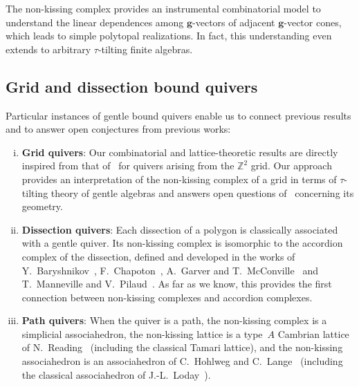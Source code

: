 \documentclass{amsart}
\theoremstyle{definition}
\newcommand{\Z}{\mathbb{Z}} %
\renewcommand{\b}[1]{\mathbf{#1}} %
\begin{document}
\noindent
The non-kissing complex provides an instrumental combinatorial model to understand the linear dependences among $\b{g}$-vectors of adjacent $\b{g}$-vector cones, which leads to simple polytopal realizations.
In fact, this understanding even extends to arbitrary $\tau$-tilting finite algebras.


\subsection*{Grid and dissection bound quivers}

\enlargethispage{.4cm}
Particular instances of gentle bound quivers enable us to connect previous results and to answer open conjectures from previous works:
\begin{enumerate}[(i)]
\item \textbf{Grid quivers}: Our combinatorial and lattice-theoretic results are directly inspired from that of~\cite{PetersenPylyavskyySpeyer, SantosStumpWelker, McConville, GarverMcConville-grid} for quivers arising from the $\Z^2$ grid. Our approach provides an interpretation of the non-kissing complex of a grid in terms of $\tau$-tilting theory of gentle algebras and answers open questions of~\cite{GarverMcConville-grid} concerning its geometry.
\item \textbf{Dissection quivers}: Each dissection of a polygon is classically associated with a gentle quiver. Its non-kissing complex is isomorphic to the accordion complex of the dissection, defined and developed in the works of Y.~Baryshnikov~\cite{Baryshnikov}, F.~Chapoton~\cite{Chapoton-quadrangulations}, A.~Garver and T.~McConville~\cite{GarverMcConville} and T.~Manneville and V.~Pilaud~\cite{MannevillePilaud-accordion}. As far as we know, this provides the first connection between non-kissing complexes and accordion complexes.
\item \textbf{Path quivers}: When the quiver is a path, the non-kissing complex is a simplicial associahedron, the non-kissing lattice is a type~$A$ Cambrian lattice of N.~Reading~\cite{Reading-CambrianLattices} (including the classical Tamari lattice), and the non-kissing associahedron is an associahedron of C.~Hohlweg and C.~Lange~\cite{HohlwegLange} (including the classical associahedron of J.-L.~Loday~\cite{Loday}).
\end{enumerate}
\end{document}
